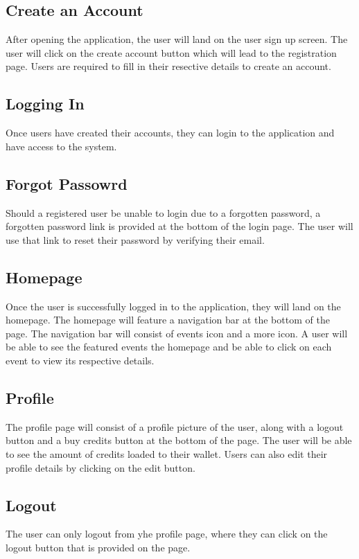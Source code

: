 

 \subsection{Create an Account}
 After opening the application, the user will land on the user sign up screen.
 The user will click on the create account button which will lead to the registration page.
 Users are required to fill in their resective details to create an account.

 \subsection{Logging In}
 Once users have created their accounts, they can login to the application and have 
 access to the system.

 \subsection{Forgot Passowrd}
 Should a registered user be unable to login due to a forgotten password,
  a forgotten password link is provided at the bottom of the login page.
  The user will use that link to reset their password by verifying their email.

\subsection{Homepage}
Once the user is successfully logged in to the application, they will land on the homepage.
The homepage will feature a navigation bar at the bottom of the page. The navigation bar
will consist of events icon and a more icon. A user will be able to see the featured events 
the homepage and be able to click on each event to view its respective details.

 \subsection{Profile}
 The profile page will consist of a profile picture of the user, along with a logout button and
a buy credits button at the bottom of the page. 
The user will be able to see the amount of credits loaded to their wallet.
Users can also edit their profile details by clicking on the edit button. 


\subsection{Logout}
The user can only logout from yhe profile page, where they can click on the logout 
button that is provided on the page.

 






